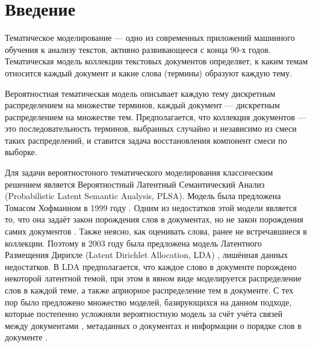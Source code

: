 \documentclass[12pt, twoside]{article}
\begin{document}


\renewcommand{\leq}{\leqslant}
\renewcommand{\geq}{\geqslant}
\renewcommand{\phi}{\varphi}
\newcommand{\eps}{\varepsilon}
\newcommand{\norm}{\mathop{\mathsf{norm}}\limits}

{}


\section{Введение}

Тематическое моделирование --- одно из современных приложений машинного обучения к анализу текстов, активно развивающееся с конца 90-х годов. Тематическая модель коллекции текстовых документов определяет, к каким темам относится каждый документ и какие слова (термины) образуют каждую тему.

Вероятностная тематическая модель описывает каждую тему дискретным распределением на множестве терминов, каждый документ --- дискретным распределением на множестве тем. Предполагается, что коллекция документов --- это последовательность терминов, выбранных случайно и независимо из смеси таких распределений, и ставится задача восстановления компонент смеси по выборке.

Для  задачи вероятностоного тематического моделирования  классическим решением является Вероятностный Латентный Семантический Анализ (Probabilistic Latent Semantic Analysis, PLSA). Модель  была предложена Томасом Хофманном в 1999 году \cite{plsadef2}. Одним из недостатков этой модели является то, что она задаёт закон порождения слов в документах, но не закон порождения самих документов \cite{plsaminus}. Также  неясно, как оценивать слова, ранее не встречавшиеся в коллекции. Поэтому в 2003 году была предложена модель Латентного Размещения Дирихле (Latent Dirichlet Allocation, LDA) \cite{ldadef1}, лишённая данных недостатков. В LDA предполагается, что каждое слово в документе порождено некоторой латентной темой, при этом в явном виде моделируется распределение слов в каждой теме, а также априорное
распределение тем в документе. С тех пор было предложено множество моделей, базирующихся на данном подходе, которые постепенно усложняли вероятностную модель за счёт учёта связей между документами \cite{connect1, connect2, connect3}, метаданных о документах \cite{metadata} и информации о порядке слов в документе \cite{order1, order2}.
\end{document}
